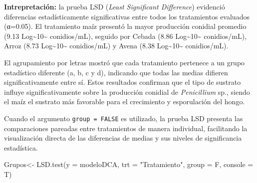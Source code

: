 \documentclass[
  spanish,
  letterpaper,
  DIV=11,
  numbers=noendperiod]{scrreprt}
\newenvironment{Shaded}{\begin{snugshade}}{\end{snugshade}}
\newcommand{\AttributeTok}[1]{\textcolor[rgb]{0.40,0.45,0.13}{#1}}
\newcommand{\FunctionTok}[1]{\textcolor[rgb]{0.28,0.35,0.67}{#1}}
\newcommand{\NormalTok}[1]{\textcolor[rgb]{0.00,0.23,0.31}{#1}}
\newcommand{\OtherTok}[1]{\textcolor[rgb]{0.00,0.23,0.31}{#1}}
\newcommand{\StringTok}[1]{\textcolor[rgb]{0.13,0.47,0.30}{#1}}
\begin{document}
\textbf{Intrepretación:} la prueba LSD (\emph{Least Significant
Difference}) evidenció diferencias estadísticamente significativas entre
todos los tratamientos evaluados (α=0.05). El tratamiento maíz presentó
la mayor producción conidial promedio (9.13
Log\textasciitilde10\textasciitilde{} conidios/mL), seguido por Cebada
(8.86 Log\textasciitilde10\textasciitilde{} conidios/mL), Arroz (8.73
Log\textasciitilde10\textasciitilde{} conidios/mL) y Avena (8.38
Log\textasciitilde10\textasciitilde{} conidios/mL).

El agrupamiento por letras mostró que cada tratamiento pertenece a un
grupo estadístico diferente (a, b, c y d), indicando que todas las
medias difieren significativamente entre sí. Estos resultados confirman
que el tipo de sustrato influye significativamente sobre la producción
conidial de \emph{Penicillium} sp., siendo el maíz el sustrato más
favorable para el crecimiento y esporulación del hongo.

Cuando el argumento \texttt{group\ =\ FALSE} es utilizado, la prueba LSD
presenta las comparaciones pareadas entre tratamientos de manera
individual, facilitando la visualización directa de las diferencias de
medias y sus niveles de significancia estadística.

\begin{Shaded}
\begin{Highlighting}[]
\NormalTok{Grupos}\OtherTok{\textless{}{-}} \FunctionTok{LSD.test}\NormalTok{(}\AttributeTok{y =}\NormalTok{ modeloDCA, }\AttributeTok{trt =} \StringTok{"Tratamiento"}\NormalTok{, }\AttributeTok{group =}\NormalTok{ F, }\AttributeTok{console =}\NormalTok{ T)}
\end{Highlighting}
\end{Shaded}
\end{document}
